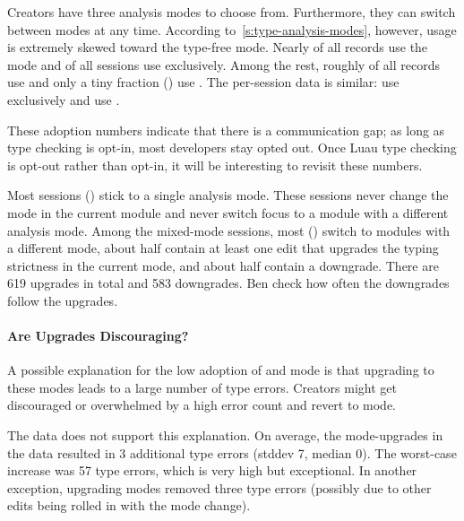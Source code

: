 \documentclass[english,submission,cleveref]{programming}
\begin{document}
Creators have three analysis modes to choose from.
Furthermore, they can switch between modes at any time.
According to~\cref{s:type-analysis-modes}, however, usage is
extremely skewed toward the type-free \mnocheck{} mode.
Nearly  of all records use the \mnocheck{} mode
and  of all sessions use \mnocheck{} exclusively.
Among the rest, roughly  of all records use \mnonstrict{} and only a
tiny fraction () use \mstrict{}.
The per-session data is similar:  use \mnonstrict{} exclusively
and  use \mstrict{}.

These adoption numbers indicate that there is a communication gap;
as long as type checking is opt-in, most developers stay opted out.
Once Luau type checking is opt-out rather than opt-in, it will be interesting
to revisit these numbers.

Most sessions () stick to a single analysis mode.
These sessions never change the mode in the current module and never switch
focus to a module with a different analysis mode.
Among the mixed-mode sessions, most () switch to modules with
a different mode, about half contain at least one edit that upgrades
the typing strictness in the
current mode, and about half contain a downgrade.
There are 619 upgrades in total and 583 downgrades.
\FILL{} Ben check how often the downgrades follow the upgrades.


\paragraph{Are Upgrades Discouraging?}


A possible explanation for the low adoption of \mnonstrict{} and
\mstrict{} mode is that upgrading to these modes leads to a large
number of type errors.
Creators might get discouraged or overwhelmed by a high error count and revert to
\mnocheck{} mode.

The data does not support this explanation.
On average, the mode-upgrades in the data resulted in 3 additional
type errors (stddev 7, median 0).
The worst-case increase was 57 type errors, which is very high
but exceptional.
In another exception, upgrading modes removed three type errors
(possibly due to other edits being rolled in with the
mode change).
\end{document}

